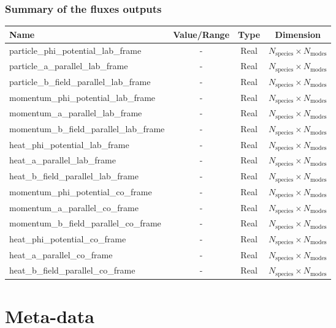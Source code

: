 \documentclass[fleqn]{report}
\begin{document}
\subsection{Summary of the fluxes outputs}
\begin{tabularx}{\textwidth}{|L|S|S|S|}
\hline
Name & Value/Range & Type & Dimension \\
\hline
particle\_phi\_potential\_lab\_frame & - & Real & $N_\textrm{species}\times N_\textrm{modes}$\\ 
particle\_a\_parallel\_lab\_frame & - & Real & $N_\textrm{species}\times N_\textrm{modes}$\\ 
particle\_b\_field\_parallel\_lab\_frame & - & Real & $N_\textrm{species}\times N_\textrm{modes}$\\ 
momentum\_phi\_potential\_lab\_frame & - & Real & $N_\textrm{species}\times N_\textrm{modes}$\\ 
momentum\_a\_parallel\_lab\_frame & - & Real & $N_\textrm{species}\times N_\textrm{modes}$\\ 
momentum\_b\_field\_parallel\_lab\_frame & - & Real & $N_\textrm{species}\times N_\textrm{modes}$\\ 
heat\_phi\_potential\_lab\_frame & - & Real & $N_\textrm{species}\times N_\textrm{modes}$\\ 
heat\_a\_parallel\_lab\_frame & - & Real & $N_\textrm{species}\times N_\textrm{modes}$\\ 
heat\_b\_field\_parallel\_lab\_frame & - & Real & $N_\textrm{species}\times N_\textrm{modes}$\\ 
momentum\_phi\_potential\_co\_frame & - & Real & $N_\textrm{species}\times N_\textrm{modes}$\\ 
momentum\_a\_parallel\_co\_frame & - & Real & $N_\textrm{species}\times N_\textrm{modes}$\\ 
momentum\_b\_field\_parallel\_co\_frame & - & Real & $N_\textrm{species}\times N_\textrm{modes}$\\ 
heat\_phi\_potential\_co\_frame & - & Real & $N_\textrm{species}\times N_\textrm{modes}$\\ 
heat\_a\_parallel\_co\_frame & - & Real & $N_\textrm{species}\times N_\textrm{modes}$\\ 
heat\_b\_field\_parallel\_co\_frame & - & Real & $N_\textrm{species}\times N_\textrm{modes}$\\ 
\hline
\end{tabularx}



\chapter{Meta-data}
\end{document}
